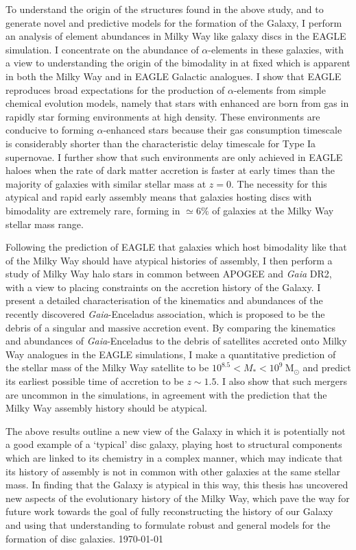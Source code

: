 To understand the origin of the structures found in the above study, and to generate novel and predictive models for the formation of the Galaxy, I perform an analysis of element abundances in Milky Way like galaxy discs in the EAGLE simulation. I concentrate on the abundance of $\alpha$-elements in these galaxies, with a view to understanding the origin of the bimodality in \afe{} at fixed \feh{} which is apparent in both the Milky Way and in EAGLE Galactic analogues. I show that EAGLE reproduces broad expectations for the production of $\alpha$-elements from simple chemical evolution models, namely that stars with enhanced \afe{} are born from gas in rapidly star forming environments at high density. These environments are conducive to forming $\alpha$-enhanced stars because their gas consumption timescale is considerably shorter than the characteristic delay timescale for Type Ia supernovae. I further show that such environments are only achieved in EAGLE haloes when the rate of dark matter accretion is faster at early times than the majority of galaxies with similar stellar mass at $z=0$. The necessity for this atypical and rapid early assembly means that galaxies hosting discs with \afe{} bimodality are extremely rare, forming in $\simeq 6\%$ of galaxies at the Milky Way stellar mass range.

Following the prediction of EAGLE that galaxies which host \afe{} bimodality like that of the Milky Way should have atypical histories of assembly, I then perform a study of Milky Way halo stars in common between APOGEE and \emph{Gaia} DR2, with a view to placing constraints on the accretion history of the Galaxy. I present a detailed characterisation of the kinematics and abundances of the recently discovered \emph{Gaia}-Enceladus association, which is proposed to be the debris of a singular and massive accretion event. By comparing the kinematics and abundances of \emph{Gaia}-Enceladus to the debris of satellites accreted onto Milky Way analogues in the EAGLE simulations, I make a quantitative prediction of the stellar mass of the Milky Way satellite to be $10^{8.5} < M_{*} < 10^{9}\ \mathrm{M_{\odot}}$ and predict its earliest possible time of accretion to be $z\sim1.5$. I also show that such mergers are uncommon in the simulations, in agreement with the prediction that the Milky Way assembly history should be atypical.

The above results outline a new view of the Galaxy in which it is potentially not a good example of a `typical' disc galaxy, playing host to structural components which are linked to its chemistry in a complex manner, which may indicate that its history of assembly is not in common with other galaxies at the same stellar mass. In finding that the Galaxy is atypical in this way, this thesis has uncovered new aspects of the evolutionary history of the Milky Way, which pave the way for future work towards the goal of fully reconstructing the history of our Galaxy and using that understanding to formulate robust and general models for the formation of disc galaxies. 
\vfill
{\sc \AuthorName \hfill\today}